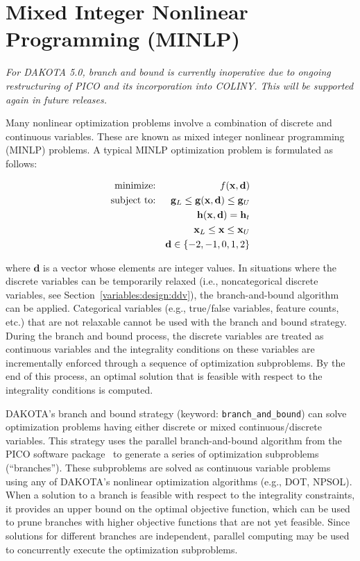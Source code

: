 \section{Mixed Integer Nonlinear Programming (MINLP)}\label{strat:minlp}

\emph{For DAKOTA 5.0, branch and bound is currently inoperative due to 
ongoing restructuring of PICO and its incorporation into COLINY.
This will be supported again in future releases.}

Many nonlinear optimization problems involve a combination of discrete
and continuous variables. These are known as mixed integer nonlinear
programming (MINLP) problems. A typical MINLP optimization problem is
formulated as follows:

\begin{eqnarray}
  \hbox{minimize:} & & f(\mathbf{x,d})\nonumber\\
  \hbox{subject to:} & & \mathbf{g}_{L} \leq \mathbf{g(x,d)}
    \leq \mathbf{g}_{U}\nonumber\\
  & & \mathbf{h(x,d)}=\mathbf{h}_{t}\label{strat:equation01}\\
  & & \mathbf{x}_{L} \leq \mathbf{x} \leq \mathbf{x}_{U}\nonumber\\
  & & \mathbf{d} \in \{-2,-1,0,1,2\}\nonumber
\end{eqnarray}

where $\mathbf{d}$ is a vector whose elements are integer values. In
situations where the discrete variables can be temporarily relaxed
(i.e., noncategorical discrete variables, see
Section~\ref{variables:design:ddv}), the branch-and-bound
algorithm can be applied. Categorical variables (e.g., true/false
variables, feature counts, etc.) that are not relaxable cannot be used
with the branch and bound strategy.  During the branch and bound
process, the discrete variables are treated as continuous variables
and the integrality conditions on these variables are incrementally
enforced through a sequence of optimization subproblems.  By the end
of this process, an optimal solution that is feasible with respect to
the integrality conditions is computed.

DAKOTA's branch and bound strategy (keyword:
\texttt{branch\_and\_bound}) can solve optimization problems having
either discrete or mixed continuous/discrete variables. This strategy
uses the parallel branch-and-bound algorithm from the PICO software
package~\cite{Eck97,Eck01} to generate a series of optimization
subproblems (``branches''). These subproblems are solved as continuous
variable problems using any of DAKOTA's nonlinear optimization
algorithms (e.g., DOT, NPSOL). When a solution to a branch is feasible
with respect to the integrality constraints, it provides an upper
bound on the optimal objective function, which can be used to prune
branches with higher objective functions that are not yet
feasible. Since solutions for different branches are independent,
parallel computing may be used to concurrently execute the
optimization subproblems.

